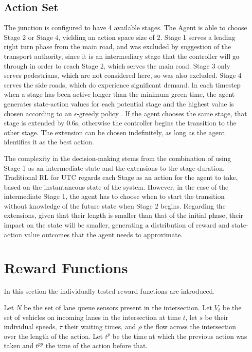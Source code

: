 \documentclass{article}
\begin{document}
\subsection{Action Set}
The junction is configured to have 4 available stages. The Agent is able to choose Stage 2 or Stage 4, yielding an action space size of 2.
Stage 1 serves a leading right turn phase from the main road, and was excluded by suggestion of the transport authority, since it is an intermediary stage that the controller will go through in order to reach Stage 2, which serves the main road.
Stage 3 only serves pedestrians, which are not considered here, so was also excluded.
Stage 4 serves the side roads, which do experience significant demand.
In each timestep when a stage has been active longer than the minimum green time, the agent generates state-action values for each potential stage and the highest value is chosen according to an $\epsilon$-greedy policy \cite{suttonbarto}. If the agent chooses the same stage, that stage is extended by 0.6s, otherwise the controller begins the transition to the other stage.
The extension can be chosen indefinitely, as long as the agent identifies it as the best action.

The complexity in the decision-making stems from the combination of using Stage 1 as an intermediate state and the extensions to the stage duration.
Traditional RL for UTC regards each Stage as an action for the agent to take, based on the instantaneous state of the system.
However, in the case of the intermediate Stage 1, the agent has to choose when to start the transition without knowledge of the future state when Stage 2 begins.
Regarding the extensions, given that their length is smaller than that of the initial phase, their impact on the state will be smaller, generating a distribution of reward and state-action value outcomes that the agent needs to approximate.

\section{Reward Functions} \label{rewards}
In this section the individually tested reward functions are introduced.

Let $N$ be the set of lane queue sensors present in the intersection.
Let $V_t$ be the set of vehicles on incoming lanes in the intersection at time $t$, let $s$ be their individual speeds, $\tau$ their waiting times, and $\rho$ the flow across the intersection over the length of the action.
Let $t^p$ be the time at which the previous action was taken and $t^{pp}$ the time of the action before that.
\end{document}
